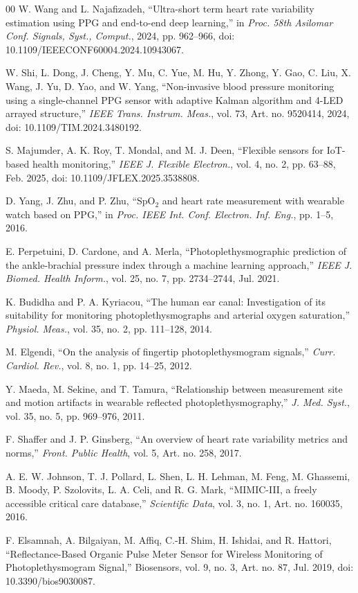 \documentclass{ieeeaccess}
\begin{document}
\begin{thebibliography}{00}
 W. Wang and L. Najafizadeh, ``Ultra-short term heart rate variability estimation using PPG and end-to-end deep learning,'' in \emph{Proc. 58th Asilomar Conf. Signals, Syst., Comput.}, 2024, pp. 962--966, doi: 10.1109/IEEECONF60004.2024.10943067.

 W. Shi, L. Dong, J. Cheng, Y. Mu, C. Yue, M. Hu, Y. Zhong, Y. Gao, C. Liu, X. Wang, J. Yu, D. Yao, and W. Yang, ``Non-invasive blood pressure monitoring using a single-channel PPG sensor with adaptive Kalman algorithm and 4-LED arrayed structure,'' \emph{IEEE Trans. Instrum. Meas.}, vol. 73, Art. no. 9520414, 2024, doi: 10.1109/TIM.2024.3480192.

 S. Majumder, A. K. Roy, T. Mondal, and M. J. Deen, ``Flexible sensors for IoT-based health monitoring,'' \emph{IEEE J. Flexible Electron.}, vol. 4, no. 2, pp. 63--88, Feb. 2025, doi: 10.1109/JFLEX.2025.3538808.

 D. Yang, J. Zhu, and P. Zhu, ``SpO$_2$ and heart rate measurement with wearable watch based on PPG,'' in \emph{Proc. IEEE Int. Conf. Electron. Inf. Eng.}, pp. 1--5, 2016.

 E. Perpetuini, D. Cardone, and A. Merla, ``Photoplethysmographic prediction of the ankle-brachial pressure index through a machine learning approach,'' \emph{IEEE J. Biomed. Health Inform.}, vol. 25, no. 7, pp. 2734--2744, Jul. 2021.

 K. Budidha and P. A. Kyriacou, ``The human ear canal: Investigation of its suitability for monitoring photoplethysmographs and arterial oxygen saturation,'' \emph{Physiol. Meas.}, vol. 35, no. 2, pp. 111--128, 2014.

 M. Elgendi, ``On the analysis of fingertip photoplethysmogram signals,'' \emph{Curr. Cardiol. Rev.}, vol. 8, no. 1, pp. 14--25, 2012.

 Y. Maeda, M. Sekine, and T. Tamura, ``Relationship between measurement site and motion artifacts in wearable reflected photoplethysmography,'' \emph{J. Med. Syst.}, vol. 35, no. 5, pp. 969--976, 2011.

 F. Shaffer and J. P. Ginsberg, ``An overview of heart rate variability metrics and norms,'' \emph{Front. Public Health}, vol. 5, Art. no. 258, 2017.

 A. E. W. Johnson, T. J. Pollard, L. Shen, L. H. Lehman, M. Feng, M. Ghassemi, B. Moody, P. Szolovits, L. A. Celi, and R. G. Mark, ``MIMIC-III, a freely accessible critical care database,'' \emph{Scientific Data}, vol. 3, no. 1, Art. no. 160035, 2016.

 F. Elsamnah, A. Bilgaiyan, M. Affiq, C.-H. Shim, H. Ishidai, and R. Hattori, “Reflectance-Based Organic Pulse Meter Sensor for Wireless Monitoring of Photoplethysmogram Signal,” Biosensors, vol. 9, no. 3, Art. no. 87, Jul. 2019, doi: 10.3390/bios9030087.


\end{thebibliography}
\vspace{5em}
\end{document}
